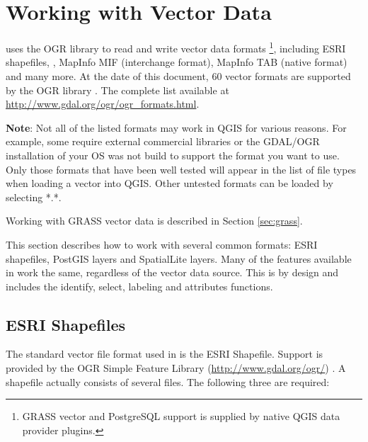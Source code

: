 
\chapter{Working with Vector Data}\label{label_workingvector}


\qg uses the OGR library to read and write vector data formats
\footnote{GRASS vector and PostgreSQL support is supplied by native 
QGIS data provider plugins.}, including ESRI shapefiles,
, MapInfo MIF (interchange 
format), MapInfo TAB 
(native format) and many more. 
At the date of this document, 60 vector formats are supported 
by the OGR library \cite{OGRweb}. The complete list available at 
\url{http://www.gdal.org/ogr/ogr_formats.html}.

\textbf{Note}: Not all of the listed formats may work in QGIS for various 
reasons. For example, some require external commercial libraries or 
the GDAL/OGR installation of your OS was not build to support the format you want
to use. Only those formats that have been well tested will appear in the list
of file types when loading a vector into QGIS. Other untested formats can 
be loaded by selecting *.*.

Working with GRASS vector data is described in Section \ref{sec:grass}.

This section describes how to work with several common formats:
ESRI shapefiles, PostGIS layers and SpatialLite layers. Many of the
features available in \qg work the same, regardless of the vector data source.
This is by design and includes the identify, select, labeling and attributes
functions.

\section{ESRI Shapefiles}

The standard vector file format used in \qg is the ESRI Shapefile. Support
is provided by the OGR Simple Feature Library (\url{http://www.gdal.org/ogr/})
. A shapefile actually consists of several files. The following three 
are required:

